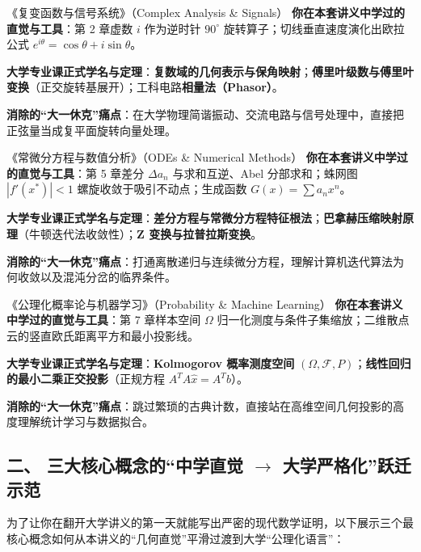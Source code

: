 \begin{fastcard}{《复变函数与信号系统》（Complex Analysis \& Signals）}
\textbf{你在本套讲义中学过的直觉与工具}：第 2 章虚数 $i$ 作为逆时针 $90^\circ$ 旋转算子；切线垂直速度演化出欧拉公式 $e^{i\theta}=\cos\theta+i\sin\theta$。
\par\textbf{大学专业课正式学名与定理}：\textbf{复数域的几何表示与保角映射}；\textbf{傅里叶级数与傅里叶变换}（正交旋转基展开）；工科电路\textbf{相量法（Phasor）}。
\par\textbf{消除的“大一休克”痛点}：在大学物理简谐振动、交流电路与信号处理中，直接把正弦量当成复平面旋转向量处理。
\end{fastcard}

\begin{fastcard}{《常微分方程与数值分析》（ODEs \& Numerical Methods）}
\textbf{你在本套讲义中学过的直觉与工具}：第 5 章差分 $\Delta a_n$ 与求和互逆、Abel 分部求和；蛛网图 $|f'(x^*)|<1$ 螺旋收敛于吸引不动点；生成函数 $G(x)=\sum a_n x^n$。
\par\textbf{大学专业课正式学名与定理}：\textbf{差分方程与常微分方程特征根法}；\textbf{巴拿赫压缩映射原理}（牛顿迭代法收敛性）；\textbf{Z 变换与拉普拉斯变换}。
\par\textbf{消除的“大一休克”痛点}：打通离散递归与连续微分方程，理解计算机迭代算法为何收敛以及混沌分岔的临界条件。
\end{fastcard}

\begin{fastcard}{《公理化概率论与机器学习》（Probability \& Machine Learning）}
\textbf{你在本套讲义中学过的直觉与工具}：第 7 章样本空间 $\Omega$ 归一化测度与条件子集缩放；二维散点云的竖直欧氏距离平方和最小投影线。
\par\textbf{大学专业课正式学名与定理}：\textbf{Kolmogorov 概率测度空间} $(\Omega, \mathcal{F}, P)$；\textbf{线性回归的最小二乘正交投影}（正规方程 $A^TA\hat{x}=A^Tb$）。
\par\textbf{消除的“大一休克”痛点}：跳过繁琐的古典计数，直接站在高维空间几何投影的高度理解统计学习与数据拟合。
\end{fastcard}

\subsection*{二、 三大核心概念的“中学直觉 $\to$ 大学严格化”跃迁示范}

为了让你在翻开大学讲义的第一天就能写出严密的现代数学证明，以下展示三个最核心概念如何从本讲义的“几何直觉”平滑过渡到大学“公理化语言”：

